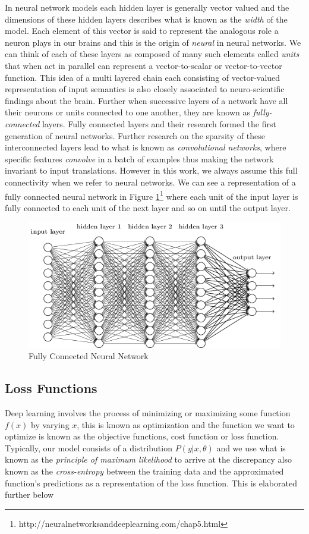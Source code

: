 \documentclass[14pt]{extarticle}
\numberwithin{equation}{section}
\begin{document}
		In neural network models each hidden layer is generally vector valued and the dimensions of these hidden layers describes what is known as the \textit{width} of the model. Each element of this vector is said to represent the analogous role a neuron plays in our brains and this is the origin of \textit{neural} in neural networks. We can think of each of these layers as composed of many such elements called \textit{units} that when act in parallel can represent a vector-to-scalar or vector-to-vector function. This idea of a multi layered chain each consisting of vector-valued representation of input semantics is also closely associated to neuro-scientific findings about the brain. Further when successive layers of a network have all their neurons or units connected to one another, they are known as \textit{fully-connected} layers. Fully connected layers and their research formed the first generation of neural networks. Further research on the sparsity of these interconnected layers lead to what is known as \textit{convolutional networks}\cite{LeCun:1998:CNI:303568.303704}, where specific features \textit{convolve} in a batch of examples thus making the network invariant to input translations. However in this work, we always assume this full connectivity when we refer to neural networks. We can see a representation of a fully connected neural network in Figure \ref{nn-fully-connected}\footnote{http://neuralnetworksanddeeplearning.com/chap5.html} where each unit of the input layer is fully connected to each unit of the next layer and so on until the output layer.
		\begin{figure}[h]
			\vspace{0.2cm}
			\centering
			\includegraphics[scale=0.7]{neuralnetwork}
			\caption{Fully Connected Neural Network
			\label{nn-fully-connected}}
		\end{figure}
		\subsection{Loss Functions}
		Deep learning involves the process of minimizing or maximizing some function $f(x)$ by varying $x$\cite{Goodfellow-et-al-2016}, this is known as optimization and the function we want to optimize is known as the objective functions, cost function or loss function. Typically, our model consists of a distribution $P(y | x, \theta)$ and we use what is known as the \textit{principle of maximum likelihood} to arrive at the discrepancy also known as the \textit{cross-entropy} between the training data and the approximated function's predictions as a representation of the loss function. This is elaborated further below
\end{document}
